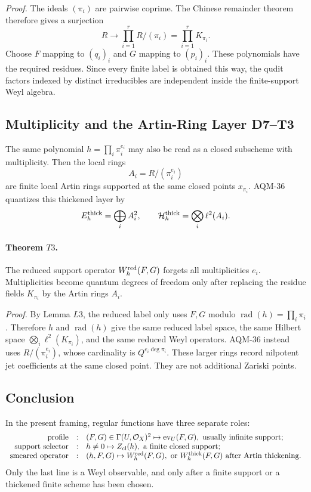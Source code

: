 \emph{Proof.}
The ideals \((\pi_i)\) are pairwise coprime.  The Chinese remainder theorem
therefore gives a surjection
\[
  R\longrightarrow\prod_{i=1}^r R/(\pi_i)=\prod_{i=1}^rK_{\pi_i}.
\]
Choose \(F\) mapping to \((q_i)_i\) and \(G\) mapping to \((p_i)_i\).  These
polynomials have the required residues.  Since every finite label is obtained
this way, the qudit factors indexed by distinct irreducibles are independent
inside the finite-support Weyl algebra.

\subsection{Multiplicity and the Artin-Ring Layer D7--T3}
The same polynomial \(h=\prod_i\pi_i^{e_i}\) may also be read as a closed
subscheme with multiplicity.  Then the local rings
\[
  A_i=R/(\pi_i^{e_i})
\]
are finite local Artin rings supported at the same closed points \(x_{\pi_i}\).
AQM-36 quantizes this thickened layer by
\[
  E_h^{\rm thick}=\bigoplus_i A_i^2,\qquad
  \mathcal H_h^{\rm thick}=\bigotimes_i\ell^2(A_i).
\]

\paragraph{Theorem \(T3\).}
The reduced support operator \(W_h^{\rm red}(F,G)\) forgets all multiplicities
\(e_i\).  Multiplicities become quantum degrees of freedom only after replacing
the residue fields \(K_{\pi_i}\) by the Artin rings \(A_i\).

\emph{Proof.}
By Lemma \(L3\), the reduced label only uses \(F,G\) modulo
\(\operatorname{rad}(h)=\prod_i\pi_i\).  Therefore \(h\) and
\(\operatorname{rad}(h)\) give the same reduced label space, the same Hilbert
space \(\bigotimes_i\ell^2(K_{\pi_i})\), and the same reduced Weyl operators.
AQM-36 instead uses \(R/(\pi_i^{e_i})\), whose cardinality is
\(Q^{e_i\deg\pi_i}\).  These larger rings record nilpotent jet coefficients at
the same closed point.  They are not additional Zariski points.

\subsection{Conclusion}
In the present framing, regular functions have three separate roles:
\[
\begin{array}{rcl}
\text{profile} &:& (F,G)\in\Gamma(U,\mathcal O_X)^2
        \mapsto \operatorname{ev}_U(F,G),\text{ usually infinite support};\\
\text{support selector} &:& h\ne0\mapsto Z_{\rm cl}(h),\text{ a finite closed
        support};\\
\text{smeared operator} &:& (h,F,G)\mapsto W_h^{\rm red}(F,G),
        \text{ or }W_h^{\rm thick}(F,G)\text{ after Artin thickening}.
\end{array}
\]
Only the last line is a Weyl observable, and only after a finite support or a
thickened finite scheme has been chosen.
